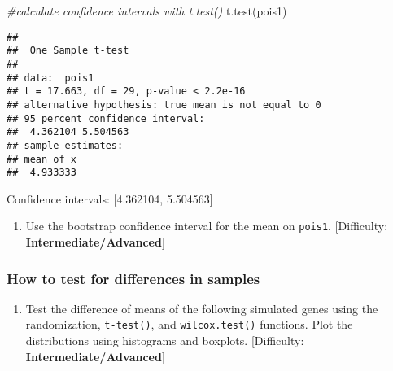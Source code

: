 \documentclass[
]{article}
\newenvironment{Shaded}{\begin{snugshade}}{\end{snugshade}}
\newcommand{\CommentTok}[1]{\textcolor[rgb]{0.56,0.35,0.01}{\textit{#1}}}
\newcommand{\FunctionTok}[1]{\textcolor[rgb]{0.00,0.00,0.00}{#1}}
\newcommand{\NormalTok}[1]{#1}
\providecommand{\tightlist}{%
  \setlength{\itemsep}{0pt}\setlength{\parskip}{0pt}}
\begin{document}
\begin{Shaded}
\begin{Highlighting}[]
\CommentTok{\#calculate confidence intervals with \textquotesingle{}t.test()\textquotesingle{}}
\FunctionTok{t.test}\NormalTok{(pois1)}
\end{Highlighting}
\end{Shaded}

\begin{verbatim}
## 
##  One Sample t-test
## 
## data:  pois1
## t = 17.663, df = 29, p-value < 2.2e-16
## alternative hypothesis: true mean is not equal to 0
## 95 percent confidence interval:
##  4.362104 5.504563
## sample estimates:
## mean of x 
##  4.933333
\end{verbatim}

Confidence intervals: {[}4.362104, 5.504563{]}

\begin{enumerate}
\def\labelenumi{\arabic{enumi}.}
\setcounter{enumi}{4}
\tightlist
\item
  Use the bootstrap confidence interval for the mean on \texttt{pois1}.
  {[}Difficulty: \textbf{Intermediate/Advanced}{]}
\end{enumerate}

\hypertarget{how-to-test-for-differences-in-samples}{%
\subsubsection{How to test for differences in
samples}\label{how-to-test-for-differences-in-samples}}

\begin{enumerate}
\def\labelenumi{\arabic{enumi}.}
\tightlist
\item
  Test the difference of means of the following simulated genes using
  the randomization, \texttt{t-test()}, and \texttt{wilcox.test()}
  functions. Plot the distributions using histograms and boxplots.
  {[}Difficulty: \textbf{Intermediate/Advanced}{]}
\end{enumerate}
\end{document}
